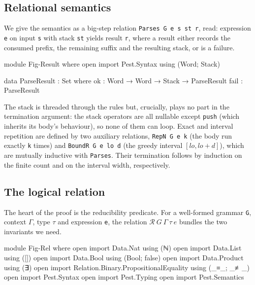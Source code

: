 \documentclass[preprint,12pt]{elsarticle}
\theoremstyle{definition}
\begin{document}
\subsection{Relational semantics}\label{sec:agda-semantics}

We give the semantics as a big-step relation \lstinline{Parses G e s st r},
read: expression \lstinline{e} on input \lstinline{s} with stack \lstinline{st}
yields result \lstinline{r}, where a result either records the consumed prefix,
the remaining suffix and the resulting stack, or is a failure.

\begin{code}[hide]
module Fig-Result where
  open import Pest.Syntax using (Word; Stack)
\end{code}
\begin{code}
  data ParseResult : Set where
    ok   : Word → Word → Stack → ParseResult
    fail : ParseResult
\end{code}

The stack is threaded through the rules but, crucially, plays no part in the
termination argument: the stack operators are all nullable except
\lstinline{push} (which inherits its body's behaviour), so none of them can loop.
Exact and interval repetition are defined by two auxiliary relations,
\lstinline{RepN G e k} (the body run exactly \lstinline{k} times) and
\lstinline{BoundR G e lo d} (the greedy interval $[lo, lo+d]$), which are
mutually inductive with \lstinline{Parses}. Their termination follows by
induction on the finite count and on the interval width, respectively.

\subsection{The logical relation}\label{sec:agda-rel}

The heart of the proof is the reducibility predicate. For a well-formed grammar
\lstinline{G}, context $\Gamma$, type $\tau$ and expression \lstinline{e}, the
relation $\mathcal{R}\ G\ \Gamma\ \tau\ e$ bundles the two invariants we need.

\begin{code}[hide]
module Fig-Rel where
  open import Data.Nat using (ℕ)
  open import Data.List using ([])
  open import Data.Bool using (Bool; false)
  open import Data.Product using (∃)
  open import Relation.Binary.PropositionalEquality using (_≡_; _≢_)
  open import Pest.Syntax
  open import Pest.Typing
  open import Pest.Semantics
\end{code}
\end{document}
